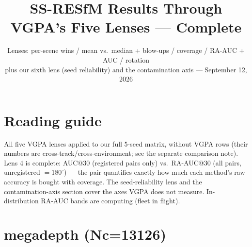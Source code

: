 \documentclass[10pt]{article}
\title{SS-RESfM Results Through VGPA's Five Lenses --- Complete}
\author{Lenses: per-scene wins / mean vs.\ median + blow-ups / coverage / RA-AUC + AUC / rotation\\
plus our sixth lens (seed reliability) and the contamination axis --- September 12, 2026}
\date{}
\begin{document}
\maketitle
\section*{Reading guide}
All five VGPA lenses applied to our full 5-seed matrix, without VGPA rows (their numbers
are cross-track/cross-environment; see the separate comparison note). Lens 4 is complete:
AUC@30 (registered pairs only) vs.\ RA-AUC@30 (all pairs, unregistered $=180^\circ$) ---
the pair quantifies exactly how much each method's raw accuracy is bought with coverage.
The seed-reliability lens and the contamination-axis section cover the axes VGPA does not
measure. In-distribution RA-AUC bands are computing (fleet in flight).

\section*{megadepth  (Nc=13126)}
\begin{center}\end{center}
\end{document}

